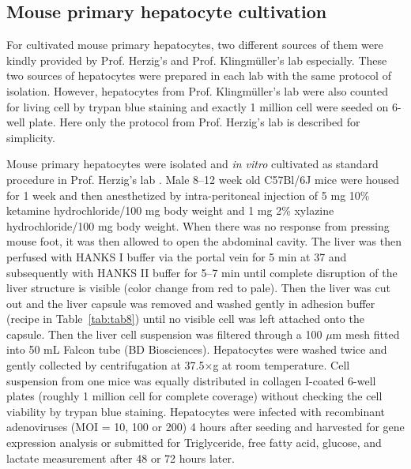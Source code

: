 \subsection{Mouse primary hepatocyte cultivation}

For cultivated mouse primary hepatocytes, two different sources of them were kindly provided by Prof. Herzig's and Prof. Klingm\"uller's lab especially. These two sources of hepatocytes were prepared in each lab with the same protocol of isolation. However, hepatocytes from Prof. Klingm\"uller's lab were also counted for living cell by trypan blue staining and exactly 1 million cell were seeded on 6-well plate. Here only the protocol from Prof. Herzig's lab is described for simplicity.

Mouse primary hepatocytes were isolated and \textit{in vitro} cultivated as standard procedure in Prof. Herzig's lab  \cite{klingmuller_primary_2006}. Male 8--12 week old C57Bl/6J mice were housed for 1 week and then anesthetized by intra-peritoneal injection of 5 mg 10\% ketamine hydrochloride/100 mg body weight and 1 mg 2\% xylazine hydrochloride\slash100 mg body weight. When there was no response from pressing mouse foot, it was then allowed to open the abdominal cavity. The liver was then perfused with HANKS I buffer via the portal vein for 5 min at 37{\celsius} and subsequently with HANKS II buffer for 5--7 min until complete disruption of the liver structure is visible (color change from red to pale). Then the liver was cut out and the liver capsule was removed and washed gently in adhesion buffer (recipe in Table~\ref{tab:tab8}) until no visible cell was left attached onto the capsule. Then the liver cell suspension was filtered through a 100 $\mu$m mesh fitted into 50 mL Falcon tube (BD Biosciences). Hepatocytes were washed twice and gently collected by centrifugation at 37.5$\times$g at room temperature. Cell suspension from one mice was equally distributed in collagen I-coated 6-well plates (roughly 1 million cell for complete coverage) without checking the cell viability by trypan blue staining. Hepatocytes were infected with recombinant adenoviruses (MOI = 10, 100 or 200) 4 hours after seeding and harvested for gene expression analysis or submitted for Triglyceride, free fatty acid, glucose, and lactate measurement after 48 or 72 hours later.

